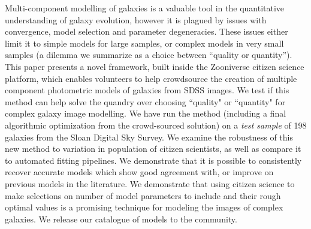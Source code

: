\documentclass[../main.tex]{subfiles}
\begin{document}
Multi-component modelling of galaxies is a valuable tool in the quantitative understanding of galaxy evolution, however it is plagued by issues with convergence, model selection and parameter degeneracies. These issues either limit it to simple models for large samples, or complex models in very small samples  (a dilemma we summarize as a choice between “quality or quantity”). This paper presents a novel framework, built inside the Zooniverse citizen science platform, which enables volunteers to help crowdsource the creation of multiple component photometric models of galaxies from SDSS images. We test if this method can help solve the quandry over choosing ``quality" or ``quantity" for complex galaxy image modelling.
We have run the method (including a final algorithmic optimization from the crowd-sourced solution) on a \textit{test sample} of 198 galaxies from the Sloan Digital Sky Survey. We examine the robustness of this new method to variation in population of citizen scientists, as well as compare it to automated fitting pipelines. We demonstrate that it is possible to consistently recover accurate models which show good agreement with, or improve on previous models in the literature. We demonstrate that using citizen science to make selections on number of model parameters to include and their rough optimal values is a promising technique for modeling the images of complex galaxies. We release our catalogue of models to the community.
\end{document}
